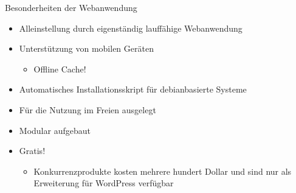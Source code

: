 \begin{frame}{Besonderheiten der Webanwendung}
	\begin{itemize}
		\item<1-> Alleinstellung durch eigenständig lauffähige Webanwendung
		\item<2-> Unterstützung von mobilen Geräten
		\begin{itemize}
			\item <2->Offline Cache!
		\end{itemize}
		\item<3-> Automatisches Installationsskript für debianbasierte Systeme
		\item<4-> Für die Nutzung im Freien ausgelegt
		\item<5-> Modular aufgebaut
		\item<6-> Gratis!
		\begin{itemize}
			\item <6->Konkurrenzprodukte kosten mehrere hundert Dollar und sind nur als Erweiterung für WordPress verfügbar
		\end{itemize}
	\end{itemize}
\end{frame}